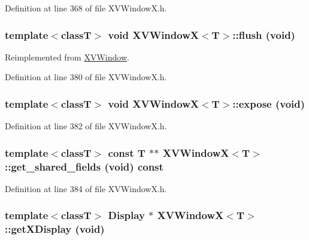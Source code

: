 Definition at line 368 of file XVWindow\-X.h.\label{XVWindowX_a13}
\hypertarget{class_XVWindowX_a13}{
\subsubsection[flush]{\setlength{\rightskip}{0pt plus 5cm}template$<$classT$>$ void XVWindow\-X$<$T$>$::flush (void)}}




Reimplemented from \hyperlink{class_XVWindow}{XVWindow}.

Definition at line 380 of file XVWindow\-X.h.\label{XVWindowX_a14}
\hypertarget{class_XVWindowX_a14}{
\subsubsection[expose]{\setlength{\rightskip}{0pt plus 5cm}template$<$classT$>$ void XVWindow\-X$<$T$>$::expose (void)}}




Definition at line 382 of file XVWindow\-X.h.\label{XVWindowX_a15}
\hypertarget{class_XVWindowX_a15}{
\subsubsection[get_shared_fields]{\setlength{\rightskip}{0pt plus 5cm}template$<$classT$>$ const T $\ast$$\ast$ XVWindow\-X$<$T$>$::get\_\-shared\_\-fields (void) const}}




Definition at line 384 of file XVWindow\-X.h.\label{XVWindowX_a20}
\hypertarget{class_XVWindowX_a20}{
\subsubsection[getXDisplay]{\setlength{\rightskip}{0pt plus 5cm}template$<$classT$>$ Display $\ast$ XVWindow\-X$<$T$>$::get\-XDisplay (void)}}


